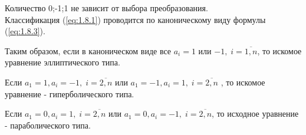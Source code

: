 \documentclass[../main.tex]{subfiles}
\begin{document}
Количество 0;-1;1 не зависит от выбора преобразования. \\
Классификация (\ref{eq:1.8.1}) проводится по каноническому виду формулы (\ref{eq:1.8.3}). \\
\par Таким образом, если в каноническом виде все $a_i = 1$ или $-1, \; i=\overline{1,n}$, то искомое уравнение эллиптического типа. \\
\par Если $a_1 = 1, a_i = -1, \; i = \overline{2,n} $ или $a_1 = -1, a_i = 1, \; i = \overline{2,n}$ , то искомое уравнение - гиперболического типа. \\
\par Если $a_1 = 0, a_i = 1, \; i = \overline{2,n} $ или $a_1=0, a_i = -1, \; i = \overline{2,n}$, то исходное уравнение - параболического типа. \\
\end{document}
